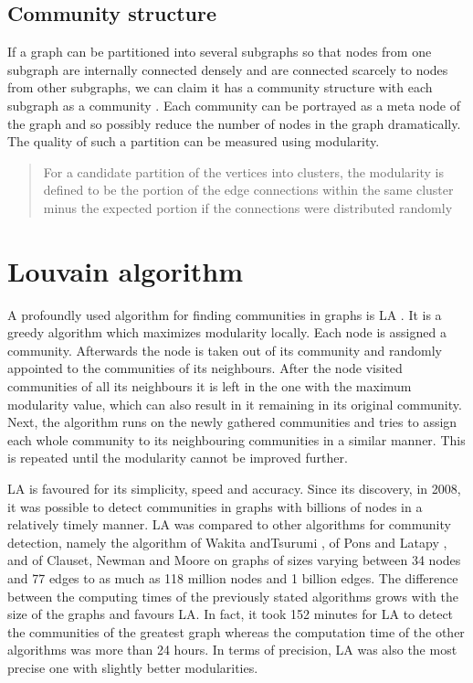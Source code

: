 \subsection{Community structure}
If a graph can be partitioned into several subgraphs so that nodes from one subgraph are internally connected densely and are connected scarcely to nodes from other subgraphs, we can claim it has a  community structure with each subgraph as a community \cite{communitiesOverview}. Each community can be portrayed as a meta node of the graph and so possibly reduce the number of nodes in the graph dramatically. The quality of such a partition can be measured using modularity. \cite{modularityOverview} \begin{quotation}  For a candidate partition of the vertices into clusters, the modularity is defined to be the portion of the edge connections within the same cluster minus the expected portion if the connections were distributed randomly \end{quotation} \cite{modularityDefinition}

\section{Louvain algorithm} \label{louvainAlgorithm}
A profoundly used algorithm for finding communities in graphs is LA \cite{louvainAlgorithm}. It is a greedy algorithm which maximizes modularity locally. Each node is assigned a community. Afterwards the node is taken out of its community and randomly appointed to the communities of its neighbours. After the node visited communities of all its neighbours it is left in the one with the maximum modularity value, which can also result in it remaining in its original community. Next, the algorithm runs on the newly gathered communities and tries to assign each whole community to its neighbouring communities in a similar manner. This is repeated until the modularity cannot be improved further.

LA is favoured for its simplicity, speed and accuracy. Since its discovery, in 2008, it was possible to detect communities in graphs with billions of nodes in a relatively timely manner. LA was compared to other algorithms for community detection, namely the algorithm of Wakita andTsurumi \cite{wakitaAndToshiyuki}, of Pons and Latapy \cite{ponsAndLatapy}, and of Clauset, Newman and Moore \cite{CNM} on graphs of sizes varying between 34 nodes and 77 edges to as much as 118 million nodes and 1 billion edges. The difference between the computing times of the previously stated algorithms grows with the size of the graphs and favours LA. In fact, it took 152 minutes for LA to detect the communities of the greatest graph whereas the computation time of the other algorithms was more than 24 hours. In terms of precision, LA was also the most precise one with slightly better modularities.

